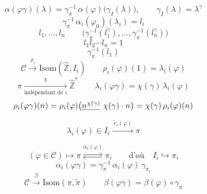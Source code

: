 \documentclass[11pt,a4paper]{article}
\begin{document}
\[
  \alpha(\varphi\gamma)(\lambda) = \gamma_{\pi}^{-1}\,\alpha(\varphi)\bigl(\gamma_{I}(\lambda)\bigr),
  \qquad \gamma_{I}(\lambda) = \lambda^{\gamma}
\]
\[
  \gamma_{\pi}^{-1}\,\alpha_{i}(\varphi_{0})(\lambda_{i}) = l_{i}
\]
\[
  l_{1}, \dots, l_{n}\qquad
  \bigl(\gamma_{\pi}^{-1}(l_{1}^{\gamma}), \dots, \gamma_{\pi}^{-1}(l_{n}^{\gamma})\bigr)
\]
\[
  l_{1} l_{2} \cdots l_{n} = 1
\]
\[
  \gamma_{\pi}^{-1}(l_{1})
\]
\[
  \mathcal{C} \xrightarrow{\ \rho_{i}\ } \mathrm{Isom}(\widehat{\mathbb{Z}}, I_{i})
  \qquad \rho_{i}(\varphi)(1) = \lambda_{i}(\varphi)
\]
\[
  \pi \xrightarrow[\text{indépendant de } i]{\ \chi\ } \widehat{\mathbb{Z}}^{*}
  \qquad \lambda_{i}(\varphi\gamma) = \chi(\gamma)\,\lambda_{i}(\varphi)
\]
\[
  \rho_{i}(\varphi\gamma)(n) = \rho_{i}(\varphi)\bigl(\struck{n^{\chi(\gamma)}}\ \chi(\gamma) \cdot n\bigr)
  = \chi(\gamma)\,\rho_{i}(\varphi)(n)
\]
\[
  \lambda_{i}(\varphi) \in I_{i} \xrightarrow{\ \widetilde{r}_{i}(\varphi)\ } \pi
\]

\[
  (\varphi \in \mathcal{C}) \longmapsto
  \pi \overset{\alpha_{i}(\varphi)}{\rightleftarrows} \pi_{i}
  \qquad \text{d'où}\quad I_{i} \hookrightarrow \pi_{i}
\]
\[
  \alpha_{i}(\varphi\gamma) = \gamma_{\pi}^{-1}\,\alpha_{i}(\varphi)\,\gamma_{\pi_{i}}
\]
\[
  \mathcal{C} \xrightarrow{\ \beta\ } \mathrm{Isom}(\pi, \widetilde{\pi})
  \qquad \beta(\varphi\gamma) = \beta(\varphi) \circ \gamma_{\pi}
\]

\end{document}
